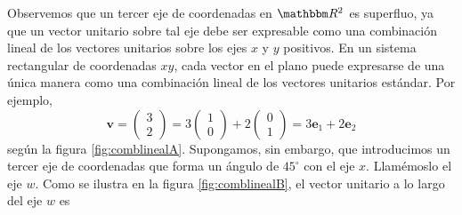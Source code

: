 Observemos que un tercer eje de coordenadas en $\RR[2]$ es superfluo, ya que un vector unitario sobre tal eje debe ser expresable como una combinación lineal de los vectores unitarios sobre los ejes $x$ y $y$ positivos. En un sistema rectangular de coordenadas $xy$, cada vector en el plano puede expresarse de una única manera como una combinación lineal de los vectores unitarios estándar. Por ejemplo,
\begin{equation}
    \mathbf{v} = \begin{pmatrix}
        3 \\
        2
    \end{pmatrix} = 3 \begin{pmatrix}
        1 \\
        0
    \end{pmatrix} + 2 \begin{pmatrix}
        0 \\
        1
    \end{pmatrix} = 3\mathbf{e}_1 + 2\mathbf{e}_2 \label{LABHQIOPQPQJDJD}
\end{equation}
según la figura \ref{fig:comblinealA}. Supongamos, sin embargo, que introducimos un tercer eje de coordenadas que forma un ángulo de $45^{\circ}$ con el eje $x$. Llamémoslo el eje $w$. Como se ilustra en la figura \ref{fig:comblinealB}, el vector unitario a lo largo del eje $w$ es
\begin{matrizn}
\end{matrizn}

